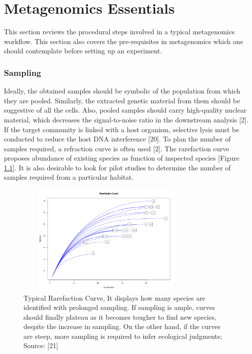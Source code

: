 \chapter{Metagenomics Essentials}
 \setcounter{page}{4}

This section reviews the procedural steps involved in a typical metagenomics workflow. This section also covers the pre-requisites in metagenomics which one should contemplate before setting up an experiment.

\subsection{Sampling}
Ideally, the obtained samples should be symbolic of the population from which they are pooled. Similarly, the extracted genetic material from them should be suggestive of all the cells. Also, pooled samples should carry high-quality nuclear material, which decreases the signal-to-noise ratio in the downstream analysis [2]. If the target community is linked with a host organism, selective lysis must be conducted to reduce the host DNA interference [20]. To plan the number of samples required, a refraction curve is often used [2]. The rarefaction curve proposes abundance of existing species as function of inspected species [Figure \ref{fig:figure1}]. It is also desirable to look for pilot studies to determine the number of samples required from a particular habitat.

\begin{figure}
  \centering
  \includegraphics[width=9cm, height=5.5cm] {../figures/Figure1.png}
  \caption{Typical Rarefaction Curve, It displays how many species are identified with prolonged sampling. If sampling is ample, curves should finally plateau as it becomes tougher to find new species, despite the increase in sampling. On the other hand, if the curves are steep, more sampling is required to infer ecological judgments; Source: [21]}
  \label{fig:figure1}
\end{figure}

